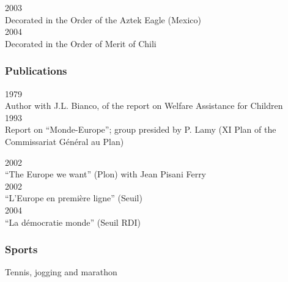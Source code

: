 2003\\
Decorated in the Order of the Aztek Eagle (Mexico)\\
     
2004\\
Decorated in the Order of Merit of Chili\\
      

  
\subsubsection{Publications}
1979\\
    	Author with J.L. Bianco, of the report on Welfare Assistance for Children\\
      
1993\\
    Report on “Monde-Europe”; group presided by P. Lamy (XI Plan of the Commissariat Général au Plan)
      
2002\\
    “The Europe we want” (Plon) with Jean Pisani Ferry\\
      
2002\\
    “L’Europe en première ligne” (Seuil)\\
      
 2004\\
“La démocratie monde” (Seuil RDI)\\
      

\subsubsection{Sports}
Tennis, jogging and marathon